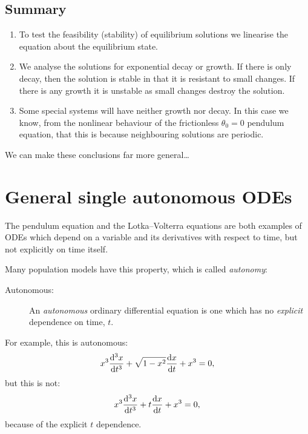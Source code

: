 \documentclass[main.tex]{subfiles}
\begin{document}
\subsection{Summary}
\begin{enumerate}
\item To test the feasibility (stability) of equilibrium solutions we linearise the equation about the equilibrium state.
\item We analyse the solutions for exponential decay or growth. If there is only decay, then the solution is stable in that it is resistant to small changes. If there is any growth it is unstable as small changes destroy the solution.
\item Some special systems will have neither growth nor decay. In this case we know, from the nonlinear behaviour of the frictionless $\theta_0=0$ pendulum equation, that this is because neighbouring solutions are periodic.
\end{enumerate}
We can make these conclusions far more general\dots




\section{General single autonomous ODEs}\label{odestab}\label{autode}
The pendulum equation and the Lotka--Volterra equations are both examples of ODEs which depend on a variable and its derivatives with respect to time, but not explicitly on time itself.

Many population models have this property, which is called \emph{autonomy}:

\begin{description}
	\item[Autonomous:] An \emph{autonomous} ordinary differential equation is one which has no \emph{explicit} dependence on time, $t$.
\end{description}

For example, this is autonomous:
\begin{equation}
\label{example}
x^3\fddd{x}{t} + \sqrt{1-x^2}\fd{x}{t} + x^3 = 0,
\end{equation}
but this is not:
\begin{equation}
x^3\fddd{x}{t} + t  \fd{x}{t} + x^3 = 0,
\end{equation}
because of the explicit $t$ dependence. 
\end{document}
